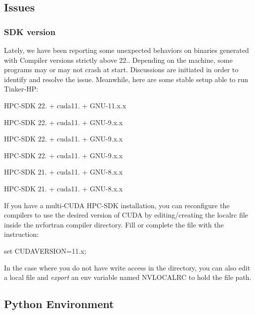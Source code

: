 \subsection*{Issues}

\subsubsection*{S\-D\-K version}

Lately, we have been reporting some unexpected behaviors on binaries generated with Compiler versions strictly above 22.. Depending on the machine, some programs may or may not crash at start. Discussions are initiated in order to identify and resolve the issue. Meanwhile, here are some stable setup able to run Tinker-\/\-H\-P\-:


\begin{DoxyItemize}
\item H\-P\-C-\/\-S\-D\-K 22. + cuda11. + G\-N\-U-\/11.\-x.\-x
\item H\-P\-C-\/\-S\-D\-K 22. + cuda11. + G\-N\-U-\/9.\-x.\-x
\item H\-P\-C-\/\-S\-D\-K 22. + cuda11. + G\-N\-U-\/9.\-x.\-x
\item H\-P\-C-\/\-S\-D\-K 22. + cuda11. + G\-N\-U-\/9.\-x.\-x
\item H\-P\-C-\/\-S\-D\-K 21. + cuda11. + G\-N\-U-\/8.\-x.\-x
\item H\-P\-C-\/\-S\-D\-K 21. + cuda11. + G\-N\-U-\/8.\-x.\-x
\end{DoxyItemize}

If you have a multi-\/\-C\-U\-D\-A H\-P\-C-\/\-S\-D\-K installation, you can reconfigure the compilers to use the desired version of C\-U\-D\-A by editing/creating the {\ttfamily localrc} file inside the {\ttfamily nvfortran} compiler directory. Fill or complete the file with the instruction\-:


\begin{DoxyCode}
set CUDAVERSION=11.x;
\end{DoxyCode}


In the case where you do not have write access in the directory, you can also edit a local file and {\itshape export} an env variable named {\ttfamily N\-V\-L\-O\-C\-A\-L\-R\-C} to hold the file path.

\subsection*{Python Environment}

